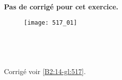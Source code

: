 \normaltrue \difficilefalse \tdifficilefalse
\correctionfalse


\setcounter{numques}{0}
\ifcorrection
\else
\textbf{Pas de corrigé pour cet exercice.}
\fi

\ifprof
\else


\begin{figure}[H]
\centering
\texttt{[image: 517\_01]}
\end{figure}


\ifprof ~\\
\else
\fi

\ifprof ~\\
\else
\fi


\ifprof
\else
\begin{flushright}
\footnotesize{Corrigé  voir \ref{B2:14-gl:517}.}
\end{flushright}%
\fi